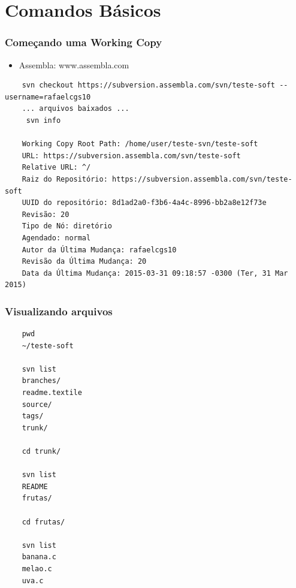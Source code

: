 \documentclass{beamer}
\begin{document}
\section{Comandos B\'asicos}

\begin{frame}[fragile]
    \frametitle{Come\c{c}ando uma Working Copy}
    \begin{itemize}
        \item Assembla: www.assembla.com
    \end{itemize}


    \begin{bash}{}
        {\tiny
            \begin{verbatim}
    svn checkout https://subversion.assembla.com/svn/teste-soft --username=rafaelcgs10
    ... arquivos baixados ...
     svn info

    Working Copy Root Path: /home/user/teste-svn/teste-soft
    URL: https://subversion.assembla.com/svn/teste-soft
    Relative URL: ^/
    Raiz do Repositório: https://subversion.assembla.com/svn/teste-soft
    UUID do repositório: 8d1ad2a0-f3b6-4a4c-8996-bb2a8e12f73e
    Revisão: 20
    Tipo de Nó: diretório
    Agendado: normal
    Autor da Última Mudança: rafaelcgs10
    Revisão da Última Mudança: 20
    Data da Última Mudança: 2015-03-31 09:18:57 -0300 (Ter, 31 Mar 2015)
    \end{verbatim}
}
    \end{bash}

\end{frame}

\begin{frame}[fragile]
    \frametitle{Visualizando arquivos}

    \begin{bash}{}
        {\tiny
            \begin{verbatim}
    pwd
    ~/teste-soft

    svn list
    branches/
    readme.textile
    source/
    tags/
    trunk/

    cd trunk/

    svn list
    README
    frutas/

    cd frutas/

    svn list
    banana.c
    melao.c
    uva.c
    \end{verbatim}
}
    \end{bash}

\end{frame}
\end{document}
